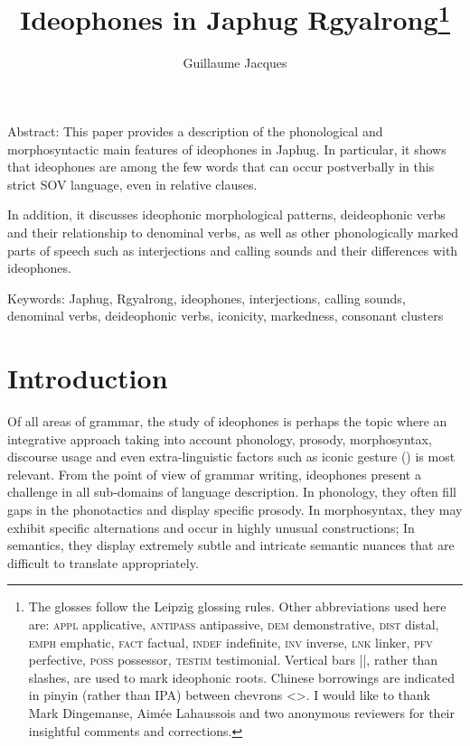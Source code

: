 \documentclass[oldfontcommands,oneside,a4paper,11pt]{article}
\begin{document}
 
 \title{Ideophones in Japhug Rgyalrong\footnote{
The glosses follow the Leipzig glossing rules. Other abbreviations used here are: \textsc{appl} applicative, \textsc{antipass} antipassive,  \textsc{dem} demonstrative, \textsc{dist} distal, \textsc{emph} emphatic, \textsc{fact} factual, \textsc{indef} indefinite, \textsc{inv} inverse,  \textsc{lnk} linker, \textsc{pfv} perfective, \textsc{poss} possessor, \textsc{testim} testimonial.  Vertical bars ||, rather than slashes, are used to mark ideophonic roots. Chinese borrowings are indicated in pinyin (rather than IPA) between chevrons <>.
I would like to thank Mark Dingemanse, Aimée Lahaussois and two anonymous reviewers for their insightful comments and corrections.
} }
\author{Guillaume Jacques}
\maketitle

 
Abstract: This paper provides a   description of the phonological and morphosyntactic main features of ideophones in Japhug. In particular, it shows that ideophones are among the few words that can occur postverbally in this strict SOV language, even in relative clauses.

In addition, it discusses  ideophonic morphological patterns, deideophonic verbs and their relationship to   denominal verbs, as well as other phonologically marked parts of speech such as interjections and calling sounds and their differences with ideophones.

Keywords: Japhug, Rgyalrong, ideophones, interjections, calling sounds, denominal verbs, deideophonic verbs, iconicity, markedness, consonant clusters


 \section{Introduction}
Of all areas of grammar, the study of ideophones is perhaps the   topic where an integrative approach taking into account phonology, prosody, morphosyntax, discourse usage and even extra-linguistic factors such as iconic gesture (\citealt{dingemanse11phd}) is most relevant. From the point of view of grammar writing, ideophones present a challenge in all sub-domains of language description. In phonology, they often fill gaps in the phonotactics and display specific prosody. In morphosyntax, they may exhibit specific alternations and occur in highly unusual constructions; In semantics, they display extremely subtle and intricate semantic nuances that are   difficult to translate appropriately.
\end{document}
